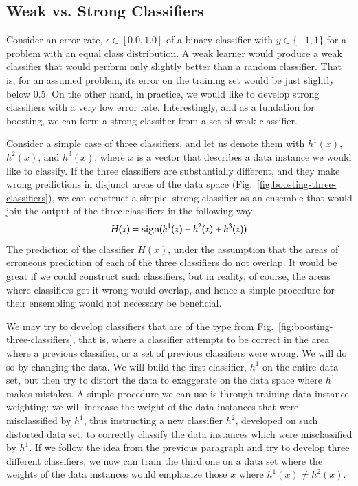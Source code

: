 \begin{refsection}
\subsection*{Weak vs. Strong Classifiers}

Consider an error rate, $\epsilon\in[0.0,1.0]$ of a binary classifier with $y\in\{-1,1\}$ for a problem with an equal class distribution. A weak learner would produce a weak classifier that would perform only slightly better than a random classifier. That is, for an assumed problem, its error on the training set would be just slightly below $0.5$. On the other hand, in practice, we would like to develop strong classifiers with a very low error rate. Interestingly, and as a fundation for boosting, we can form a strong classifier from a set of weak classifier.

Consider a simple case of three classifiers, and let us denote them with $h^1(x)$, $h^2(x)$, and $h^3(x)$, where $x$ is a vector that describes a data instance we would like to classify. If the three classifiers are substantially different, and they make wrong predictions in disjunct areas of the data space (Fig.~\ref{fig:boosting-three-classifiers}), we can construct a simple, strong classifier as an ensemble that would join the output of the three classifiers in the following way:
\begin{equation}
H(x) = \text{sign}(h^1(x) + h^2(x) + h^3(x))
\end{equation}
The prediction of the classifier $H(x)$, under the assumption that the areas of erroneous prediction of each of the three classifiers do not overlap. It would be great if we could construct such classifiers, but in reality, of course, the areas where classifiers get it wrong would overlap, and hence a simple procedure for their ensembling would not necessary be beneficial.

We may try to develop classifiers that are of the type from Fig.~\ref{fig:boosting-three-classifiers}, that is, where a classifier attempts to be correct in the area where a previous classifier, or a set of previous classifiers were wrong. We will do so by changing the data. We will build the first classifier, $h^1$ on the entire data set, but then try to distort the data to exaggerate on the data space where $h^1$ makes mistakes. A simple procedure we can use is through training data instance weighting: we will increase the weight of the data instances that were misclassified by $h^1$, thus instructing a new classifier $h^2$, developed on such distorted data set, to correctly classify the data instances which were misclassified by $h^1$. If we follow the idea from the previous paragraph and try to develop three different classifiers, we now can train the third one on a data set where the weights of the data instances would emphasize those $x$ where $h^1(x)\neq h^2(x)$.


\end{refsection}

